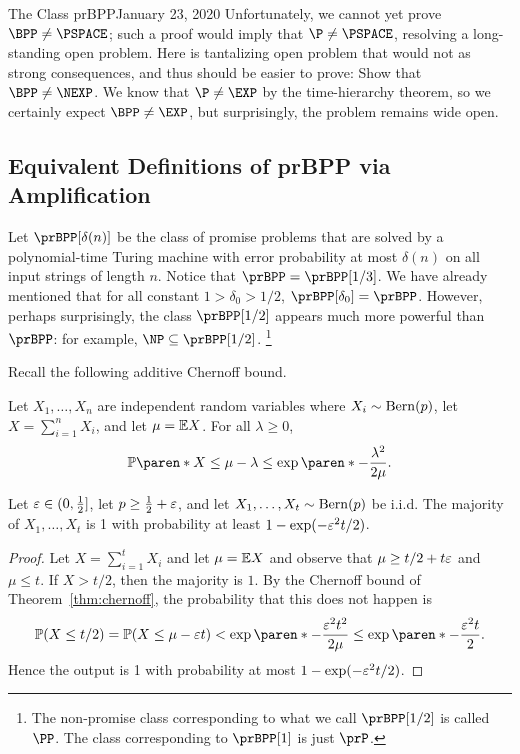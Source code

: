\begin{lecture}{1}{The Class prBPP}{January 23, 2020}
Unfortunately, we cannot yet prove $\BPP \ne \PSPACE$; such a proof would imply
that $\P \ne \PSPACE$, resolving a long-standing open problem. Here is
tantalizing open problem that would not as strong consequences, and thus should
be easier to prove: Show that $\BPP \ne \NEXP$. We know that $\P
\ne \EXP$ by the time-hierarchy theorem, so we certainly expect $\BPP \ne
\EXP$, but surprisingly, the problem remains wide open.

\subsection{Equivalent Definitions of prBPP via Amplification}

Let $\prBPP[\delta(n)]$ be the class of promise problems that are solved by a
polynomial-time Turing machine with error probability at most $\delta(n)$ on
all input strings of length $n$. Notice that $\prBPP = \prBPP[1/3]$. We have
already mentioned that for all constant $1> \delta_0 > 1/2$, $\prBPP[\delta_0] =
\prBPP$. However, perhaps surprisingly, the class $\prBPP[1/2]$ appears much
more powerful than $\prBPP$: for example, $\NP \subseteq \prBPP[1/2]$.%
\footnote{The non-promise class corresponding to what we call $\prBPP[1/2]$ is
called $\PP$. The class corresponding to $\prBPP[1]$ is just $\prP$.}

Recall the following additive Chernoff bound.

\begin{theorem}\label{thm:chernoff}
  Let $X_1, \dots, X_n$ are independent random variables where $X_i \sim
  \operatorname{Bern}(p)$, let $X = \sum_{i=1}^n X_i$, and let $\mu = \mathbb{E} X$. For all
  $\lambda \ge 0$, \[
    \Pr\paren*{X \le \mu - \lambda} \le \exp\paren*{-\frac{\lambda^2}{2\mu}}.
  \]
\end{theorem}

\begin{proposition}\label{prop:maj}
  Let $\varepsilon \in (0, \frac{1}{2}]$, let $p \ge \frac{1}{2} + \varepsilon$, and let $X_1,
  \dots, X_t \sim \operatorname{Bern}(p)$ be i.i.d. The majority of $X_1, \dots, X_t$ is 1
  with probability at least $1 - \exp(-\varepsilon^2 t/2)$.
\end{proposition}

\begin{proof}
  Let $X = \sum_{i=1}^t X_i$ and let $\mu = \mathbb{E} X$ and observe that $\mu \ge
  t/2 + t\varepsilon$ and $\mu \le t$. If $X > t/2$, then the majority is $1$. By the
  Chernoff bound of Theorem~\ref{thm:chernoff}, the probability that this does
  not happen is \[
    \Pr(X \le t/2) = \Pr(X \le \mu - \eps t) < \exp\paren*{-\frac{\eps^2t^2}{2\mu}} \le \exp\paren*{-\frac{\eps^2t}{2}}.
  \]
  Hence the output is 1 with probability at most $1 - \exp(-\varepsilon^2 t/2)$.
\end{proof}


\end{lecture}
